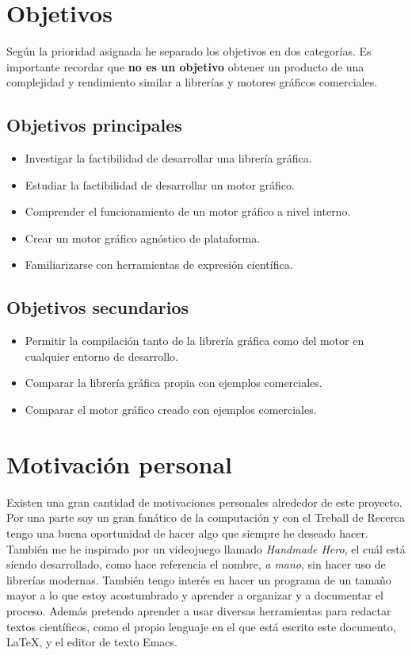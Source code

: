 \documentclass{report}
\begin{document}
\newpage
\section{Objetivos}
Según la prioridad asignada he separado los objetivos en dos categorías. Es importante recordar que \textbf{no es un objetivo} obtener un producto de una complejidad y rendimiento similar a librerías y motores gráficos comerciales.
\subsection{Objetivos principales}
\begin{itemize}
\item Investigar la factibilidad de desarrollar una librería gráfica.
\item Estudiar la factibilidad de desarrollar un motor gráfico.
\item Comprender el funcionamiento de un motor gráfico a nivel interno.
\item Crear un motor gráfico agnóstico de plataforma.
\item Familiarizarse con herramientas de expresión científica.
\end{itemize} 
\subsection{Objetivos secundarios}
\begin{itemize}
\item Permitir la compilación tanto de la librería gráfica como del motor en cualquier entorno de desarrollo.
\item Comparar la librería gráfica propia con ejemplos comerciales.
\item Comparar el motor gráfico creado con ejemplos comerciales.
\end{itemize}

\section{Motivación personal}
Existen una gran cantidad de motivaciones personales alrededor de este proyecto. Por una parte soy un gran fanático de la computación y con el Treball de Recerca tengo una buena oportunidad de hacer algo que siempre he deseado hacer. También me he inspirado por un videojuego llamado \textit{Handmade Hero}, el cuál está siendo desarrollado, como hace referencia el nombre, \textit{a mano}, sin hacer uso de librerías modernas. También tengo interés en hacer un programa de un tamaño mayor a lo que estoy acostumbrado y aprender a organizar y a documentar el proceso. Además pretendo aprender a usar diversas herramientas para redactar textos científicos, como el propio lenguaje en el que está escrito este documento, \LaTeX, y el editor de texto Emacs.
\end{document}
